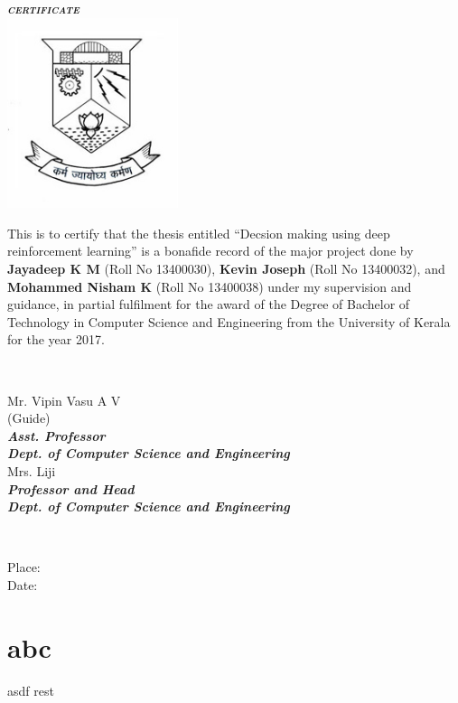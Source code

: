 \documentclass[twoside,letterpaper]{article}
\begin{document}
	\begin{titlepage}
		\begin{centering}
			\textbf{\textit{\LARGE\textsc{{certificate}}}}\\[0.5cm]
			\includegraphics[width=5cm]{images/logo.jpg}\\

		\end{centering}

		\large{This is to certify that the thesis entitled ``Decsion making using deep reinforcement learning'' is a bonafide record of the major project done by \textbf{Jayadeep K M} (Roll No 13400030), \textbf{Kevin Joseph} (Roll No 13400032), and \textbf{Mohammed Nisham K} (Roll No 13400038) under my supervision and guidance, in partial fulfilment for the award of the Degree of Bachelor of Technology in Computer Science and Engineering from the University of Kerala for the year 2017.}\\[1.5cm]

		\begin{minipage}{0.4\textwidth}
		\begin{flushleft}
		\end{flushleft}
		\end{minipage}
		~
		\begin{minipage}{0.6\textwidth}
		\begin{centering} \large
		\large{Mr. Vipin Vasu A V}\\
		\small{(Guide)}\\
		\small{\textit{\textbf{Asst. Professor}}}\\
		\small{\textit{\textbf{Dept. of Computer Science and Engineering}}}\\[1.5cm]

		\large{Mrs. Liji}\\
		\small{\textit{\textbf{Professor and Head}}}\\
		\small{\textit{\textbf{Dept. of Computer Science and Engineering}}}\\
		\end{centering}
		\end{minipage}\\[1.0cm]

		\begin{flushleft}
		Place: \\
		Date: \\
		\end{flushleft}
		\vfill %
	\end{titlepage}

	
	\tableofcontents
	\newpage
	\listoffigures
	\newpage
	\printacronyms[include-classes=abbrev,name=Abbreviations]
	\newpage

	\section{abc}
		asdf \ac{rest}
\end{document}
